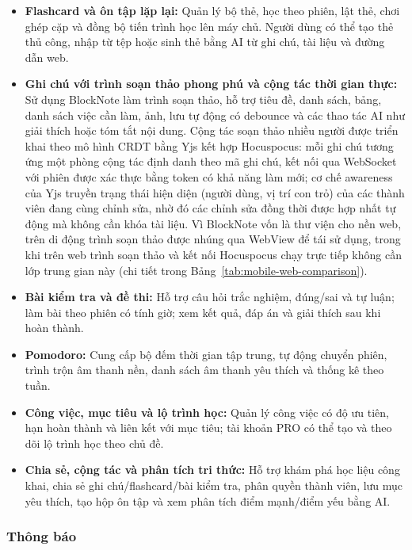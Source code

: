 \begin{itemize}
    \item \textbf{Flashcard và ôn tập lặp lại:} Quản lý bộ thẻ, học theo phiên, lật thẻ, chơi ghép cặp và đồng bộ tiến trình học lên máy chủ. Người dùng có thể tạo thẻ thủ công, nhập từ tệp hoặc sinh thẻ bằng AI từ ghi chú, tài liệu và đường dẫn web.
    \item \textbf{Ghi chú với trình soạn thảo phong phú và cộng tác thời gian thực:} Sử dụng BlockNote làm trình soạn thảo, hỗ trợ tiêu đề, danh sách, bảng, danh sách việc cần làm, ảnh, lưu tự động có debounce và các thao tác AI như giải thích hoặc tóm tắt nội dung. Cộng tác soạn thảo nhiều người được triển khai theo mô hình CRDT bằng Yjs kết hợp Hocuspocus: mỗi ghi chú tương ứng một phòng cộng tác định danh theo mã ghi chú, kết nối qua WebSocket với phiên được xác thực bằng token có khả năng làm mới; cơ chế awareness của Yjs truyền trạng thái hiện diện (người dùng, vị trí con trỏ) của các thành viên đang cùng chỉnh sửa, nhờ đó các chỉnh sửa đồng thời được hợp nhất tự động mà không cần khóa tài liệu. Vì BlockNote vốn là thư viện cho nền web, trên di động trình soạn thảo được nhúng qua WebView để tái sử dụng, trong khi trên web trình soạn thảo và kết nối Hocuspocus chạy trực tiếp không cần lớp trung gian này (chi tiết trong Bảng~\ref{tab:mobile-web-comparison}).
    \item \textbf{Bài kiểm tra và đề thi:} Hỗ trợ câu hỏi trắc nghiệm, đúng/sai và tự luận; làm bài theo phiên có tính giờ; xem kết quả, đáp án và giải thích sau khi hoàn thành.
    \item \textbf{Pomodoro:} Cung cấp bộ đếm thời gian tập trung, tự động chuyển phiên, trình trộn âm thanh nền, danh sách âm thanh yêu thích và thống kê theo tuần.
    \item \textbf{Công việc, mục tiêu và lộ trình học:} Quản lý công việc có độ ưu tiên, hạn hoàn thành và liên kết với mục tiêu; tài khoản PRO có thể tạo và theo dõi lộ trình học theo chủ đề.
    \item \textbf{Chia sẻ, cộng tác và phân tích tri thức:} Hỗ trợ khám phá học liệu công khai, chia sẻ ghi chú/flashcard/bài kiểm tra, phân quyền thành viên, lưu mục yêu thích, tạo hộp ôn tập và xem phân tích điểm mạnh/điểm yếu bằng AI.
\end{itemize}

\subsubsection{Thông báo}
\label{subsubsec:frontend-notifications}

